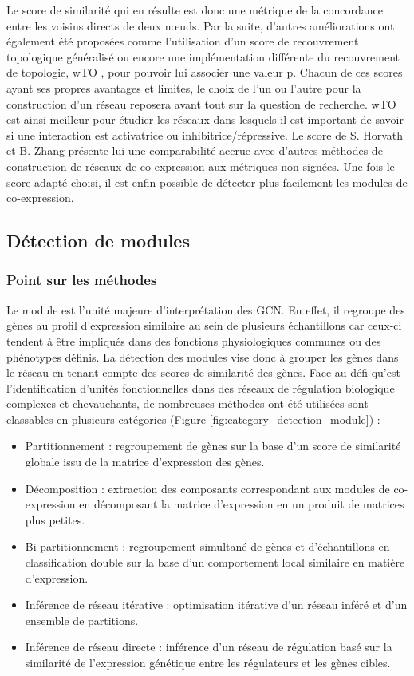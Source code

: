 Le score de similarité qui en résulte est donc une métrique de la concordance entre les voisins directs de deux nœuds. Par la suite, d'autres améliorations ont également été proposées comme l'utilisation d'un score de recouvrement topologique généralisé \cite{Yip2007Dec} ou encore une implémentation différente du recouvrement de topologie, wTO \cite{Gysi2018}, pour pouvoir lui associer une valeur p. Chacun de ces scores ayant ses propres avantages et limites, le choix de l'un ou l'autre pour la construction d'un réseau reposera avant tout sur la question de recherche. wTO est ainsi meilleur pour étudier les réseaux dans lesquels il est important de savoir si une interaction est activatrice ou inhibitrice/répressive. Le score de S. Horvath et B. Zhang présente lui une comparabilité accrue avec d'autres méthodes de construction de réseaux de co-expression aux métriques non signées. Une fois le score adapté choisi, il est enfin possible de détecter plus facilement les modules de co-expression.



\subsection{Détection de modules}

\subsubsection{Point sur les méthodes}

Le module est l'unité majeure d'interprétation des \acrshort{GCN}. En effet, il regroupe des gènes au profil d'expression similaire au sein de plusieurs échantillons car ceux-ci tendent à être impliqués dans des fonctions physiologiques communes ou des phénotypes définis. La détection des modules vise donc à grouper les gènes dans le réseau en tenant compte des scores de similarité des gènes. Face au défi qu'est l'identification d'unités fonctionnelles dans des réseaux de régulation biologique complexes et chevauchants, de nombreuses méthodes ont été utilisées sont classables en plusieurs catégories (Figure \ref{fig:category_detection_module}) \cite{Saelens2018} : 
\begin{itemize}
    \item Partitionnement : regroupement de gènes sur la base d'un score de similarité globale issu de la matrice d'expression des gènes.
    \item Décomposition : extraction des composants correspondant aux modules de co-expression en décomposant la matrice d'expression en un produit de matrices plus petites.
    \item Bi-partitionnement : regroupement simultané de gènes et d'échantillons en classification double sur la base d'un comportement local similaire en matière d'expression.
    \item Inférence de réseau itérative : optimisation itérative d'un réseau inféré et d'un ensemble de partitions.
    \item Inférence de réseau directe : inférence d'un réseau de régulation basé sur la similarité de l'expression génétique entre les régulateurs et les gènes cibles.
\end{itemize} 
\hfill

